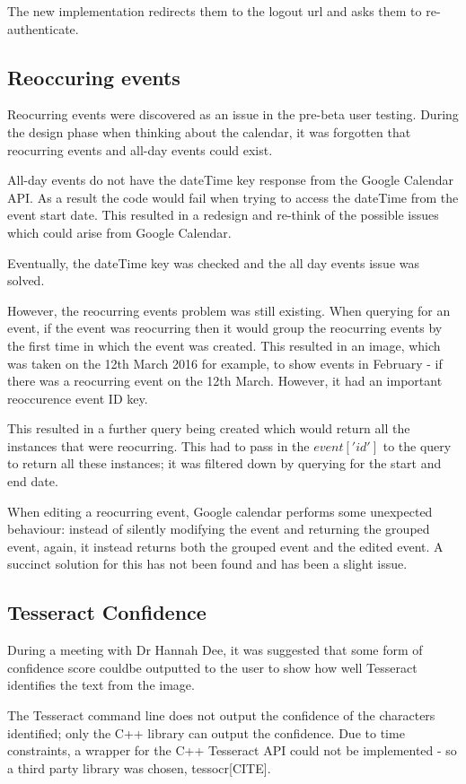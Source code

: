 The new implementation redirects them to the logout url and asks them to re-authenticate.

\subsection{Reoccuring events}
Reocurring events were discovered as an issue in the pre-beta user testing. During the design phase when thinking about the calendar, it was forgotten that reocurring events and all-day events could exist.

All-day events do not have the dateTime key response from the Google Calendar API. As a result the code would fail when trying to access the dateTime from the event start date. This resulted in a redesign and re-think of the possible issues which could arise from Google Calendar.

Eventually, the dateTime key was checked and the all day events issue was solved.

However, the reocurring events problem was still existing. When querying for an event, if the event was reocurring then it would group the reocurring events by the first time in which the event was created. This resulted in an image, which was taken on the 12th March 2016 for example, to show events in February - if there was a reocurring event on the 12th March. However, it had an important reoccurence event ID key.

This resulted in a further query being created which would return all the instances that were reocurring. This had to pass in the $event['id']$ to the query to return all these instances; it was filtered down by querying for the start and end date.

When editing a reocurring event, Google calendar performs some unexpected behaviour: instead of silently modifying the event and returning the grouped event, again, it instead returns both the grouped event and the edited event. A succinct solution for this has not been found and has been a slight issue.

\subsection{Tesseract Confidence}
During a meeting with Dr Hannah Dee, it was suggested that some form of confidence score couldbe outputted to the user to show how well Tesseract identifies the text from the image.

The Tesseract command line does not output the confidence of the characters identified; only the C++ library can output the confidence. Due to time constraints, a wrapper for the C++ Tesseract API could not be implemented - so a third party library was chosen, tessocr[CITE].

